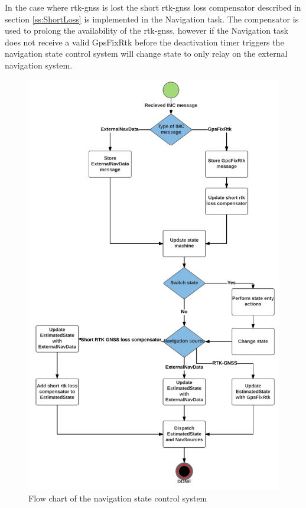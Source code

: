 In the case where \gls{rtk-gnss} is lost the short \gls{rtk-gnss} loss compensator described in section \ref{ss:ShortLoss} is implemented in the Navigation task. The compensator is used to prolong the availability of the \gls{rtk-gnss}, however if the Navigation task does not receive a valid GpsFixRtk before the deactivation timer triggers the navigation state control system will change state to only relay on the external navigation system.
\begin{figure}[H]
\centering
\includegraphics[scale=0.17]{figs/NavStateControl.png}
\caption{Flow chart of the navigation state control system}
\label{Fig:NavStateControlFlow}
\end{figure}
